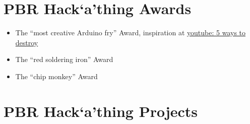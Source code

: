 \documentclass[12pt,a4paper]{scrartcl}
\newcommand{\hack}[0]{Hack`a'thing}
\begin{document}
%
%

\newpage
\section{PBR \hack{} Awards}

\begin{itemize}
\item The ``most creative Arduino fry'' Award, inspiration at \href{https://www.youtube.com/watch?v=WmcMrKELkcs}{youtube: 5 ways to destroy}
\item The ``red soldering iron'' Award
\item The ``chip monkey'' Award
\end{itemize}

\newpage
\section{PBR \hack{} Projects}
\label{proj}
\end{document}

